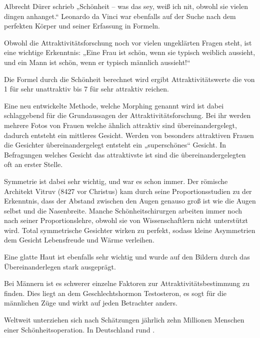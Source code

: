 Albrecht Dürer schrieb „Schönheit -- was das sey, weiß ich nit, obwohl sie vielen dingen anhanget.“
Leonardo da Vinci war ebenfalls auf der Suche nach dem perfekten Körper und seiner Erfassung in
Formeln.

Obwohl die Attraktivitätsforschung noch vor vielen ungeklärten Fragen steht, ist eine wichtige
Erkenntnis: „Eine Frau ist schön, wenn sie typisch weiblich aussieht, und ein Mann ist schön, wenn er
typisch männlich aussieht!“

Die Formel durch die Schönheit berechnet wird ergibt Attraktivitätswerte die von 1 für sehr
unattraktiv bis 7 für sehr attraktiv reichen.

Eine neu entwickelte Methode, welche Morphing genannt wird ist dabei schlaggebend für die
Grundaussagen der
Attraktivitätsforschung. Bei ihr werden mehrere Fotos von Frauen welche ähnlich attraktiv sind
übereinandergelegt, dadurch entsteht ein mittleres Gesicht. Werden von besonders attraktiven Frauen
die Gesichter übereinandergelegt entsteht ein „superschönes“ Gesicht. In Befragungen welches Gesicht
das attraktivste ist sind die übereinandergelegten oft an erster Stelle.

Symmetrie ist dabei sehr wichtig, und war es schon immer. Der römische Architekt Vitruv (8427 vor
Christus) kam durch seine Proportionsstudien zu der Erkenntnis, dass der Abstand zwischen den Augen
genauso groß ist wie die Augen selbst und die Nasenbreite.
Manche Schönheitschirurgen arbeiten immer noch nach seiner Proportionslehre, obwohl sie von
Wissenschaftlern nicht unterstützt wird. Total symmetrische Gesichter wirken zu perfekt,
sodass kleine Asymmetrien dem Gesicht Lebensfreude und Wärme verleihen.

Eine glatte Haut ist ebenfalls sehr wichtig und wurde auf den Bildern durch das
Übereinanderlegen stark ausgeprägt.

Bei Männern ist es schwerer einzelne Faktoren zur Attraktivitätsbestimmung zu finden.
Dies liegt an dem Geschlechtshormon Testosteron, es sogt für die männlichen Züge und wirkt auf jeden
Betrachter anders.

Weltweit unterziehen sich nach Schätzungen jährlich zehn Millionen Menschen einer
Schönheitsoperation. In Deutschland rund .

